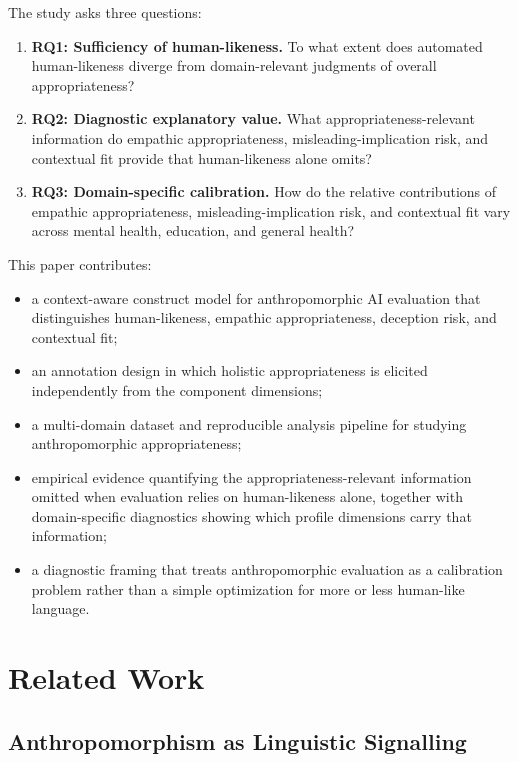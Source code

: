 \documentclass[manuscript,review,anonymous]{acmart}
\begin{document}
The study asks three questions:
\begin{enumerate}[leftmargin=*]
    \item \textbf{RQ1: Sufficiency of human-likeness.} To what extent does automated human-likeness diverge from domain-relevant judgments of overall appropriateness?
    \item \textbf{RQ2: Diagnostic explanatory value.} What appropriateness-relevant information do empathic appropriateness, misleading-implication risk, and contextual fit provide that human-likeness alone omits?
    \item \textbf{RQ3: Domain-specific calibration.} How do the relative contributions of empathic appropriateness, misleading-implication risk, and contextual fit vary across mental health, education, and general health?
\end{enumerate}

This paper contributes:
\begin{itemize}[leftmargin=*]
    \item a context-aware construct model for anthropomorphic AI evaluation that distinguishes human-likeness, empathic appropriateness, deception risk, and contextual fit;
    \item an annotation design in which holistic appropriateness is elicited independently from the component dimensions;
    \item a multi-domain dataset and reproducible analysis pipeline for studying anthropomorphic appropriateness;
    \item empirical evidence quantifying the appropriateness-relevant information omitted when evaluation relies on human-likeness alone, together with domain-specific diagnostics showing which profile dimensions carry that information;
    \item a diagnostic framing that treats anthropomorphic evaluation as a calibration problem rather than a simple optimization for more or less human-like language.
\end{itemize}

\section{Related Work}

\subsection{Anthropomorphism as Linguistic Signalling}
\end{document}

